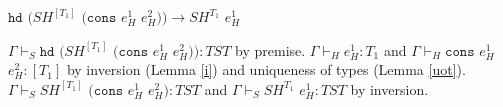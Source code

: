 \begin{case}
$\mathtt{hd}$ $(SH^{[T_{1}]}$ $(\mathtt{cons}$ $e_{H}^{1}$ $e_{H}^{2}))\rightarrow SH^{T_{1}}$ $e_{H}^{1}$

$\Gamma\vdash_{S}\mathtt{hd}$ $(SH^{[T_{1}]}$ $(\mathtt{cons}$ $e_{H}^{1}$ $e_{H}^{2})):TST$ by premise.  $\Gamma\vdash_{H}e_{H}^{1}:T_{1}$ and $\Gamma\vdash_{H}\mathtt{cons}$ $e_{H}^{1}$ $e_{H}^{2}:[T_{1}]$ by inversion (Lemma \ref{i}) and uniqueness of types (Lemma \ref{uot}).  $\Gamma\vdash_{S}SH^{[T_{1}]}$ $(\mathtt{cons}$ $e_{H}^{1}$ $e_{H}^{2}):TST$ and $\Gamma\vdash_{S}SH^{T_{1}}$ $e_{H}^{1}:TST$ by inversion.
\end{case}